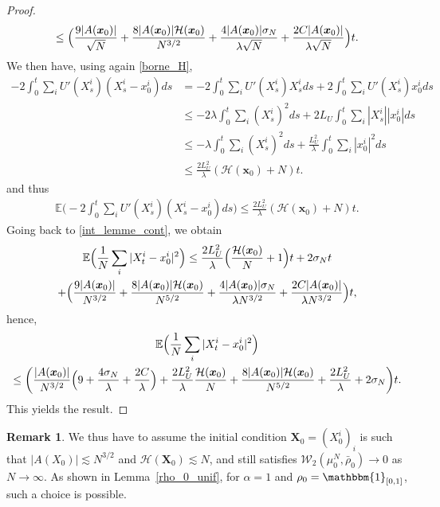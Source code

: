 \documentclass[10pt]{amsart}
\let\mathds\mathbbm
\newcommand{\bx}{{\boldsymbol{x}}}
\newcommand{\bX}{{\boldsymbol{X}}}
\theoremstyle{plain}
\theoremstyle{definition}
\newtheorem{remark}{Remark}[section]
\begin{document}
\begin{proof}
\begin{multline*}
\leq \Bigl(\frac{9|A(\bx_0)|}{\sqrt{N}}+\frac{8|A(\bx_0)|\mathcal{H}(\bx_0)}{N^{3/2}}+\frac{4|A(\bx_0)|\sigma_N}{\lambda\sqrt{N}}+\frac{2C|A(\bx_0)|}{\lambda \sqrt{N}}\Bigr)t.
\end{multline*}
We then have, using again \eqref{borne_H},
\begin{align*}
-2 \int_0^t\sum_iU'(X^i_s)(X^i_s-x^i_0)ds&=-2\int_0^t\sum_iU'(X^i_s)X^i_sds+2\int_0^t\sum_iU'(X^i_s)x^i_0ds\\
&\leq -2\lambda\int_0^t\sum_i(X^i_s)^2ds+2L_U\int_0^t\sum_i|X^i_s||x^i_0|ds\\
&\leq -\lambda\int_0^t\sum_i(X^i_s)^2ds+\frac{L_U^2}{\lambda}\int_0^t\sum_i|x^i_0|^2ds\\
&\leq \frac{2L_U^2}{\lambda}(\mathcal{H}(\bx_0)+N)t.
\end{align*}
and thus
\begin{align*}
\mathbb{E}\biggl(-2\int_0^t\sum_iU'(X^i_s)(X^i_s-x^i_0)ds\biggr)\leq \frac{2L_U^2}{\lambda}(\mathcal{H}(\bx_0)+N)t.
\end{align*}
Going back to \eqref{int_lemme_cont}, we obtain
\begin{multline*}
\mathbb{E}\Bigl(\frac{1}{N}\sum_{i}|X^i_t-x^i_0|^2\Bigr)\leq \frac{2L_U^2}{\lambda}\Bigl(\frac{\mathcal{H}(\bx_0)}{N}+1\Bigr)t+2\sigma_N t\\
+\Bigl(\frac{9|A(\bx_0)|}{N^{3/2}}+\frac{8|A(\bx_0)|\mathcal{H}(\bx_0)}{N^{5/2}}+\frac{4|A(\bx_0)|\sigma_N}{\lambda N^{3/2}}+\frac{2C|A(\bx_0)|}{\lambda N^{3/2}}\Bigr)t,
\end{multline*}
hence,
\begin{multline*}
\mathbb{E}\Bigl(\frac{1}{N}\sum_{i}|X^i_t-x^i_0|^2\Bigr)\\
\leq \biggl(\frac{|A(\bx_0)|}{N^{3/2}}\Bigl(9+\frac{4\sigma_N}{\lambda}+\frac{2C}{\lambda}\Bigr)
+\frac{2L_U^2}{\lambda}\frac{\mathcal{H}(\bx_0)}{N}+\frac{8|A(\bx_0)|\mathcal{H}(\bx_0)}{N^{5/2}}+\frac{2L_U^2}{\lambda}+2\sigma_N\biggr)t.
\end{multline*}
This yields the result.
\end{proof}

\begin{remark}
We thus have to assume the initial condition $\bX_0=\left(X^i_0\right)_i$ is such that $|A(X_0)|\lesssim N^{3/2}$ and $\mathcal{H}(\bX_0)\lesssim N$, and still satisfies $\mathcal{W}_2(\mu^N_0,\bar{\rho}_0)\to0$ as $N\to\infty$. As shown in Lemma~\ref{rho_0_unif}, for $\alpha=1$ and $\rho_0=\mathds{1}_{[0,1]}$, such a choice is possible.
\end{remark}
\end{document}

